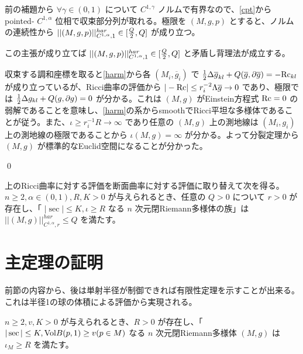 \documentclass[dvipdfmx,a4paper]{jsarticle}
\theoremstyle{definition}
\newenvironment{claim}[1]{\par\noindent\underline{Claim:}\space#1}{}
\newcommand{\der}{\partial}
\renewcommand{\bar}{\overline}
\newcommand{\Vol}{{\rm Vol}}
\newcommand{\Rc}{{\rm Rc}}
\newcommand{\R}{\mathbb{R}}
\begin{document}
前の補題から $\forall \gamma \in (0,1)$ について $C^{1,\gamma}$ ノルムで有界なので、\ref{cpt}から pointed- $C^{1,\alpha}$ 位相で収束部分列が取れる。極限を $(M,g,p)$ とすると、ノルムの連続性から $||(M,g,p)||^{har}_{C^{1,\alpha},1} \in [{Q \over 2},Q]$ が成り立つ。


この主張が成り立てば $||(M,g,p)||^{har}_{C^{1,\alpha},1} \in [{Q \over 2},Q]$ と矛盾し背理法が成立する。

収束する調和座標を取ると\ref{harm}から各 $(M_i,\bar{g}_i)$ で ${1 \over 2}\Delta \bar{g}_{kl}+Q(\bar{g},\der \bar{g})=-\Rc_{kl}$ が成り立っているが、Ricci曲率の評価から $|-\Rc| \leq r_i^{-2}\Lambda \bar{g}\to 0$ であり、極限では ${1 \over 2}\Delta g_{kl}+Q(g,\der g)=0$ が分かる。これは $(M,g)$ がEinstein方程式 $\Rc=0$ の弱解であることを意味し、\ref{harm}の系からsmoothでRicci平坦な多様体であることが従う。また、$\iota \geq r_i^{-1}R \to \infty$ であり任意の $(M,g)$ 上の測地線は $(M_i,g_i)$ 上の測地線の極限であることから $\iota(M,g)=\infty$ が分かる。よって分裂定理から $(M,g)$ が標準的なEuclid空間になることが分かった。

\qed

上のRicci曲率に対する評価を断面曲率に対する評価に取り替えて次を得る。
\thm $n\geq 2,\alpha \in (0,1),R,K>0$ が与えられるとき、任意の $Q>0$ について $r>0$ が存在し、「 $|\sec| \leq K,\iota \geq R$ なる $n$ 次元閉Riemann多様体の族」は $||(M,g)||^{har}_{C^{1,\alpha},r} \leq Q$ を満たす。

\section{主定理の証明}

前節の内容から、後は単射半径が制御できれば有限性定理を示すことが出来る。これは半径1の球の体積による評価から実現される。

\lem $n\geq 2,v,K>0$ が与えられるとき、$R>0$ が存在し、「 $|\sec| \leq K,\Vol B(p,1) \geq v (p \in M)$ なる $n$ 次元閉Riemann多様体 $(M,g)$ は $\iota_M \geq R$ を満たす。
\end{document}
